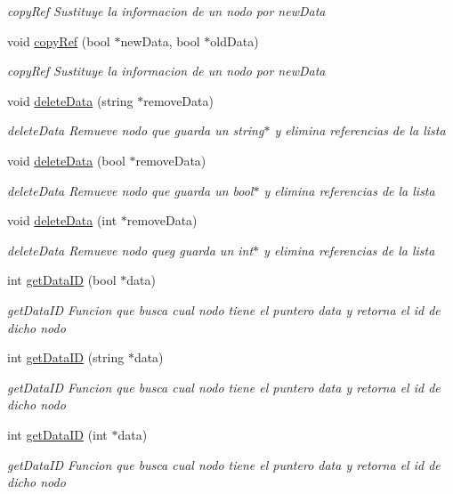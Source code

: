 \begin{DoxyCompactItemize}
\begin{DoxyCompactList}\small\item\em copy\+Ref Sustituye la informacion de un nodo por new\+Data \end{DoxyCompactList}\item 
void \hyperlink{class_garbage_collector_ade1e5043ec482abdf97d7a3c0fcaa5d0}{copy\+Ref} (bool $\ast$new\+Data, bool $\ast$old\+Data)
\begin{DoxyCompactList}\small\item\em copy\+Ref Sustituye la informacion de un nodo por new\+Data \end{DoxyCompactList}\item 
void \hyperlink{class_garbage_collector_a6e3a72d5b91b1d5c8d2985b449720c6f}{delete\+Data} (string $\ast$remove\+Data)
\begin{DoxyCompactList}\small\item\em delete\+Data Remueve nodo que guarda un string$\ast$ y elimina referencias de la lista \end{DoxyCompactList}\item 
void \hyperlink{class_garbage_collector_aaa6a0a08399c3ab0a8ec4b113a468bb6}{delete\+Data} (bool $\ast$remove\+Data)
\begin{DoxyCompactList}\small\item\em delete\+Data Remueve nodo que guarda un bool$\ast$ y elimina referencias de la lista \end{DoxyCompactList}\item 
void \hyperlink{class_garbage_collector_a47919d7aa5bc81d22cc714d5d5bf4e29}{delete\+Data} (int $\ast$remove\+Data)
\begin{DoxyCompactList}\small\item\em delete\+Data Remueve nodo queg guarda un int$\ast$ y elimina referencias de la lista \end{DoxyCompactList}\item 
int \hyperlink{class_garbage_collector_a2a37351f10e4c5814ba05f0671c867cf}{get\+Data\+ID} (bool $\ast$data)
\begin{DoxyCompactList}\small\item\em get\+Data\+ID Funcion que busca cual nodo tiene el puntero data y retorna el id de dicho nodo \end{DoxyCompactList}\item 
int \hyperlink{class_garbage_collector_a2c349aea0136c2e986a5aef3a2335470}{get\+Data\+ID} (string $\ast$data)
\begin{DoxyCompactList}\small\item\em get\+Data\+ID Funcion que busca cual nodo tiene el puntero data y retorna el id de dicho nodo \end{DoxyCompactList}\item 
int \hyperlink{class_garbage_collector_ae35f99070654ac6e4beedc41d0685739}{get\+Data\+ID} (int $\ast$data)
\begin{DoxyCompactList}\small\item\em get\+Data\+ID Funcion que busca cual nodo tiene el puntero data y retorna el id de dicho nodo \end{DoxyCompactList}\end{DoxyCompactItemize}
